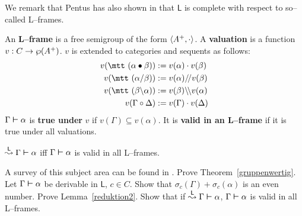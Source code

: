We remark that Pentus has also shown in \cite{pentus:models} that 
$\mathsf{L}$ is complete with respect to so--called L--frames. 
\begin{defn}
An \textbf{L--frame} is a free semigroup of the form $\langle A^+, \cdot\rangle$. 
A \textbf{valuation} is a function $v : C \rightarrow \wp(A^+)$. $v$ is 
extended to categories and sequents as follows:
\begin{equation}
\begin{split}
v(\mbox{\mtt ($\alpha\bullet\beta$)}) & := v(\alpha) \cdot v(\beta) \\
v(\mbox{\mtt ($\alpha${\tf}$\beta$)}) & := v(\alpha){/\!/} v(\beta) \\
v(\mbox{\mtt ($\beta${\tb}$\alpha$)}) & := 
	v(\beta){\backslash\!\backslash} v(\alpha) \\
v(\Gamma \circ \Delta) & := v(\Gamma) \cdot v(\Delta)
\end{split}
\end{equation} 
$\Gamma \boldsymbol{\vdash} \alpha$ is \textbf{true under} $v$ if $v(\Gamma) \subseteq 
v(\alpha)$. It is \textbf{valid in an L--frame} if it is true under all 
valuations.
\end{defn}
\begin{thm}[Pentus]
$\stackrel{\mathsf{L}}{\leadsto} \Gamma \boldsymbol{\vdash} \alpha$ iff 
$\Gamma \boldsymbol{\vdash} \alpha$ is valid in all L--frames.
\end{thm}
A survey of this subject area can be found in \cite{buszkowski:proof}.
\vplatz
\exercise
Prove Theorem~\ref{gruppenwertig}.
\vplatz
\exercise
\label{ex:gerade}
Let $\Gamma \boldsymbol{\vdash} \alpha$ be derivable in $\mathsf{L}$, $c \in C$. Show
that $\sigma_c(\Gamma) + \sigma_c(\alpha)$ is an even number.
\vplatz
\exercise
Prove Lemma~\ref{reduktion2}.
\vplatz
\exercise
Show that if $\stackrel{\mathsf{L}}{\leadsto} \Gamma \boldsymbol{\vdash} \alpha$, 
$\Gamma \boldsymbol{\vdash} \alpha$ is valid in all L--frames. 
